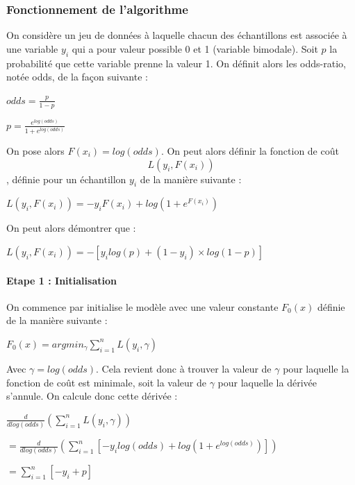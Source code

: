 \documentclass[
]{article}
\begin{document}
\hypertarget{fonctionnement-de-lalgorithme-2}{%
\subsubsection{Fonctionnement de
l'algorithme}\label{fonctionnement-de-lalgorithme-2}}

On considère un jeu de données à laquelle chacun des échantillons est
associée à une variable \(y_i\) qui a pour valeur possible 0 et 1
(variable bimodale). Soit \(p\) la probabilité que cette variable prenne
la valeur 1. On définit alors les odds-ratio, notée odds, de la façon
suivante :

\begin{center}
  $odds=\frac{p}{1-p}$
  
  $p=\frac{e^{log(odds)}}{1+e^{log(odds)}}$
\end{center}

On pose alors \(F(x_i)=log(odds)\). On peut alors définir la fonction de
coût \[L(y_i,F(x_i))\], définie pour un échantillon \(y_i\) de la
manière suivante :

\begin{center}
    $L(y_i,F(x_i))=-y_iF(x_i)+log(1+e^{F(x_i)})$
\end{center}

On peut alors démontrer que :

\begin{center}
    $L(y_i,F(x_i))=-[y_ilog(p)+(1-y_i) \times log(1-p)]$
\end{center}

\hypertarget{etape-1-initialisation}{%
\paragraph{Etape 1 : Initialisation}\label{etape-1-initialisation}}

On commence par initialise le modèle avec une valeur constante
\(F_0(x)\) définie de la manière suivante :

\begin{center}
  $F_0(x)=argmin_\gamma \sum_{i=1}^nL(y_i,\gamma)$
\end{center}

Avec \(\gamma=log(odds)\). Cela revient donc à trouver la valeur de
\(\gamma\) pour laquelle la fonction de coût est minimale, soit la
valeur de \(\gamma\) pour laquelle la dérivée s'annule. On calcule donc
cette dérivée :

\begin{center}
$\frac{d}{dlog(odds)}(\sum_{i=1}^nL(y_i,\gamma))$

$=\frac{d}{dlog(odds)}(\sum^n_{i=1}[-y_ilog(odds)+log(1+e^{log(odds)})])$

$=\sum^n_{i=1}[-y_i+p]$
\end{center}
\end{document}
